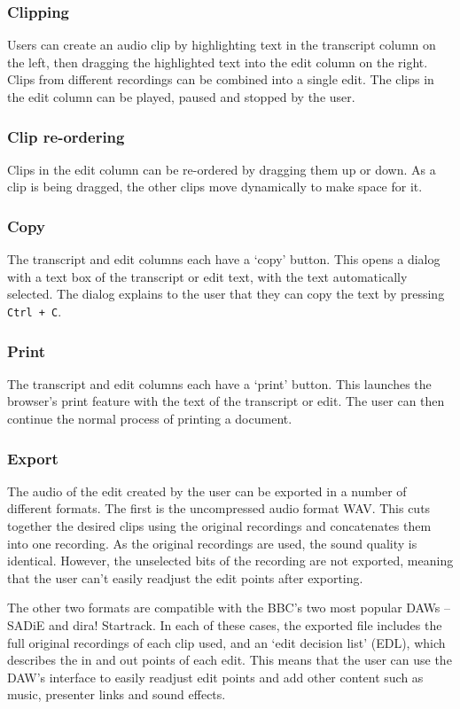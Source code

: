 \subsubsection{Clipping}
Users can create an audio clip by highlighting text in the transcript column on
the left, then dragging the highlighted text into the edit column on the right.
Clips from different recordings can be combined into a single edit.  The clips
in the edit column can be played, paused and stopped by the user.

\subsubsection{Clip re-ordering}
Clips in the edit column can be re-ordered by dragging them up or down. As
a clip is being dragged, the other clips move dynamically to make space for it.

\subsubsection{Copy}
The transcript and edit columns each have a `copy' button. This opens a dialog
with a text box of the transcript or edit text, with the text automatically
selected. The dialog explains to the user that they can copy the text by
pressing \texttt{Ctrl + C}.

\subsubsection{Print}
The transcript and edit columns each have a `print' button. This launches the
browser's print feature with the text of the transcript or edit. The user can
then continue the normal process of printing a document.

\subsubsection{Export}
The audio of the edit created by the user can be exported in a number of
different formats. The first is the uncompressed audio format WAV. This cuts
together the desired clips using the original recordings and concatenates them
into one recording. As the original recordings are used, the sound quality is
identical. However, the unselected bits of the recording are not exported,
meaning that the user can't easily readjust the edit points after exporting.

The other two formats are compatible with the BBC's two most popular DAWs --
SADiE and dira! Startrack. In each of these cases, the exported file includes
the full original recordings of each clip used, and an `edit decision list'
(EDL), which describes the in and out points of each edit. This means that the
user can use the DAW's interface to easily readjust edit points and add other
content such as music, presenter links and sound effects.

